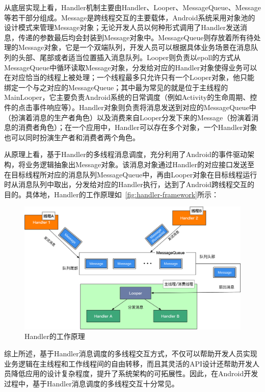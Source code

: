 从底层实现上看，Handler机制主要由Handler、Looper、MessageQueue、Message等若干部分组成。Message是跨线程交互的主要载体，Android系统采用对象池的设计模式来管理Message对象；无论开发人员以何种形式调用了Handler发送消息，传递的参数最后均会封装到Message对象中。MessageQueue则存放着所有待处理的Message对象，它是一个双端队列，开发人员可以根据具体业务场景在消息队列的头部、尾部或者适当位置插入消息队列。Looper则负责以epoll的方式从MessageQueue中循环读取Message对象，分发给对应的Handler对象使得业务可以在对应恰当的线程上被处理；一个线程最多只允许只有一个Looper对象，他只能绑定一个与之对应的MessageQueue；其中最为常见的就是位于主线程的MainLooper，它主要负责Android系统的日常调度（例如Activity的生命周期、控件的点击事件响应等）。Handler对象则负责将消息发送到对应的MessageQueue中（扮演着消息的生产者角色）以及消费来自Looper分发下来的Message（扮演着消息的消费者角色）；在一个应用中，Handler可以存在多个对象，一个Handler对象也可以同时扮演生产者和消费者两个角色。

从原理上看，基于Handler的多线程消息调度，充分利用了Android的事件驱动架构，将业务逻辑抽象出Message对象。该消息对象通过Handler的对应接口发送至在目标线程所对应的消息队列MessageQueue中，再由Looper对象在目标线程运行时从消息队列中取出，分发给对应的Handler执行，达到了Android跨线程交互的目的。具体地，Handler的工作原理如~\autoref{fig:handler-framework}所示：
 

 \begin{figure}[h]
	\centering
	\includegraphics[width=\textwidth]{./Figures/Handler-framework.png}
	\caption{ Handler的工作原理}
	\label{fig:handler-framework}
\end{figure}


综上所述，基于Handler消息调度的多线程交互方式，不仅可以帮助开发人员实现业务逻辑在主线程和工作线程间的自由转移，而且其灵活的API设计还帮助开发人员降低应用的设计复杂程度，提升了系统架构的可拓展性。因此，在Android开发过程中，基于Handler消息调度的多线程交互十分常见。
